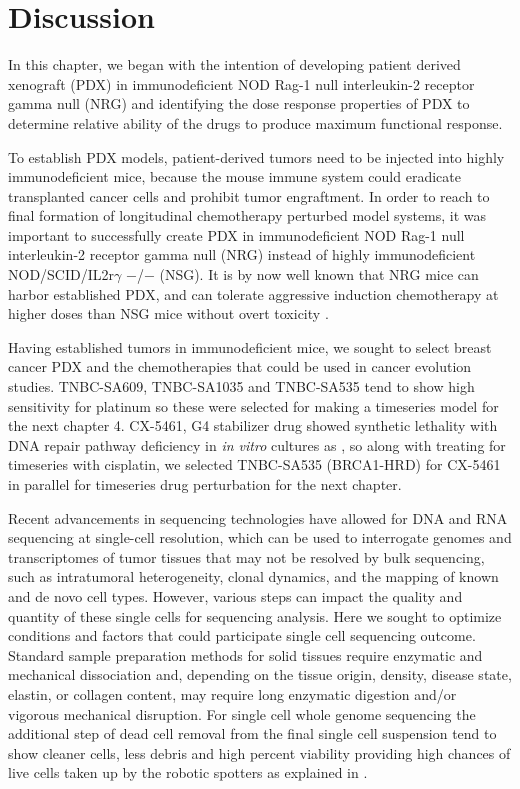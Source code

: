 \section{Discussion}
In this chapter, we began with the intention of developing patient derived xenograft (PDX) in immunodeficient NOD Rag-1 null interleukin-2 receptor gamma null (NRG) and identifying the dose response properties of PDX to determine relative ability of the drugs to produce maximum functional response.

To establish PDX models, patient-derived tumors need to be injected into highly immunodeficient mice, because the mouse immune system could eradicate transplanted cancer cells and prohibit tumor engraftment. In order to reach to final formation of longitudinal chemotherapy perturbed model systems, it was important to successfully create PDX in immunodeficient NOD Rag-1 null interleukin-2 receptor gamma null (NRG) instead of highly immunodeficient NOD/SCID/IL2r$\gamma$ $-$/$-$ (NSG). It is by now well known that \ac{NRG} mice can harbor established PDX, and can tolerate aggressive induction chemotherapy at higher doses than NSG mice without overt toxicity \cite{barve2018comparative}. 


Having established tumors in immunodeficient mice, we sought to select breast cancer \ac{PDX} and the chemotherapies that could be used in cancer evolution studies. TNBC-SA609, TNBC-SA1035 and TNBC-SA535 tend to show high sensitivity for platinum so these were selected for making a timeseries model for the next chapter 4. CX-5461, G4 stabilizer drug showed synthetic lethality with DNA repair pathway deficiency in \textit{in vitro} cultures as \cite{xu2017cx}, so along with treating for timeseries with cisplatin, we selected TNBC-SA535 (BRCA1-HRD) for CX-5461 in parallel for timeseries drug perturbation for the next chapter.

Recent advancements in sequencing technologies have allowed for DNA and RNA sequencing at single-cell resolution, which can be used to interrogate genomes and transcriptomes of tumor tissues that may not be resolved by bulk sequencing, such as intratumoral heterogeneity, clonal dynamics, and the mapping of known and de novo cell types. However, various steps can impact the quality and quantity of these single cells for sequencing analysis.
Here we sought to optimize conditions and factors that could participate single cell sequencing outcome. Standard sample preparation methods for solid tissues require enzymatic and mechanical dissociation and, depending on the tissue origin, density, disease state, elastin, or collagen content, may require long enzymatic digestion and/or vigorous mechanical disruption.
For single cell whole genome sequencing the additional step of dead cell removal from the final single cell suspension tend to show  cleaner cells, less debris and high percent viability providing high chances of live cells taken up by the robotic spotters as explained in \cite{laks2019clonal}. 

